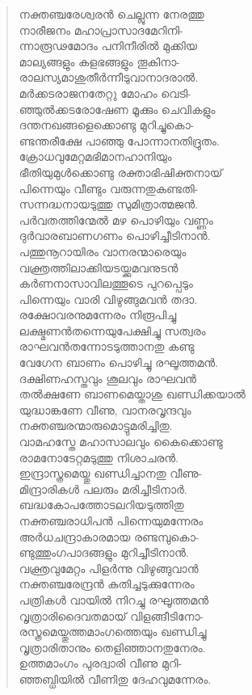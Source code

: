 \begin{verse}
നക്തഞ്ചരേശ്വരന്‍ ചെല്ലുന്ന നേരത്തു\\
നാരീജനം മഹാപ്രാസാദമേറിനി-\\
ന്നാരൂഢമോദം പനിനീരില്‍ മുക്കിയ\\
മാല്യങ്ങളും കളഭങ്ങളും തൂകിനാ-\\
രാലസ്യമാശുതീര്‍ന്നീടുവാനാദരാല്‍.\\
മര്‍ക്കടരാജനതേറ്റു മോഹം വെടി-\\
ഞ്ഞുല്‍ക്കടരോഷേണ മൂക്കും ചെവികളും\\
ദന്തനഖങ്ങളെക്കൊണ്ടു മുറിച്ചുകൊ-\\
ണ്ടന്തരീക്ഷേ പാഞ്ഞു പോന്നാനതിദ്രുതം.\\
ക്രോധവുമേറ്റമഭിമാനഹാനിയും\\
ഭീതിയുമുള്‍ക്കൊണ്ടു രക്താഭിഷിക്തനായ്\\
പിന്നെയും വീണ്ടും വരുന്നതുകണ്ടതി-\\
സന്നദ്ധനായടുത്തു സുമിത്രാത്മജന്‍.\\
പര്‍വതത്തിന്മേല്‍ മഴ പൊഴിയും വണ്ണം\\
ദുര്‍വാരബാണഗണം പൊഴിച്ചീടിനാന്‍.\\
പത്തുനൂറായിരം വാനരന്മാരെയും\\
വക്ത്രത്തിലാക്കിയടയ്ക്കുമവനുടന്‍\\
കര്‍ണനാസാവിലത്തൂടെ പുറപ്പെടും\\
പിന്നെയും വാരി വിഴുങ്ങുമവന്‍ തദാ.\\
രക്ഷോവരനുമന്നേരം നിരൂപിച്ചു\\
ലക്ഷ്മണന്‍തന്നെയുപേക്ഷിച്ചു സത്വരം\\
രാഘവന്‍തന്നോടടുത്താനതു കണ്ടു\\
വേഗേന ബാണം പൊഴിച്ചു രഘൂത്തമന്‍.\\
ദക്ഷിണഹസ്തവും ശൂലവും രാഘവന്‍\\
തല്‍ക്ഷണേ ബാണമെയ്താശു ഖണ്ഡിക്കയാല്‍\\
യുദ്ധാങ്കണേ വീണു, വാനരവൃന്ദവും\\
നക്തഞ്ചരന്മാരുമൊട്ടുമരിച്ചിതു.\\
വാമഹസ്തേ മഹാസാലവും കൈക്കൊണ്ടു\\
രാമനോടേറ്റമടുത്തു നിശാചരന്‍.\\
ഇന്ദ്രാസ്ത്രമെയ്തു ഖണ്ഡിച്ചാനതു വീണു-\\
മിന്ദ്രാരികള്‍ പലരും മരിച്ചീടിനാര്‍.\\
ബദ്ധകോപത്തോടലറിയടുത്തിതു\\
നക്തഞ്ചരാധിപന്‍ പിന്നെയുമന്നേരം\\
അര്‍ധചന്ദ്രാകാരമായ രണ്ടമ്പുകൊ-\\
ണ്ടുത്തുംഗപാദങ്ങളും മുറിച്ചീടിനാന്‍.\\
വക്ത്രവുമേറ്റം പിളര്‍ന്നു വിഴുങ്ങുവാന്‍\\
നക്തഞ്ചരേന്ദ്രന്‍ കുതിച്ചടുക്കുന്നേരം\\
പത്രികള്‍ വായില്‍ നിറച്ചു രഘൂത്തമന്‍\\
വൃത്രാരിദൈവതമായ് വിളങ്ങീടിനോ-\\
രസ്ത്രമെയ്തുത്തമാംഗത്തെയും ഖണ്ഡിച്ചു\\
വൃത്രാരിതാനും തെളിഞ്ഞാനതുനേരം.\\
ഉത്തമാംഗം പുരദ്വാരി വീണു മുറി-\\
ഞ്ഞബ്ധിയില്‍ വീണിതു ദേഹവുമന്നേരം.
\end{verse}


